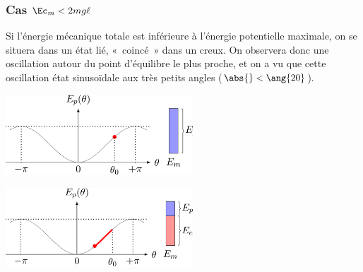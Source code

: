 \documentclass[../../main/main.tex]{subfiles}
\begin{document}
\subsubsection{Cas $\Ec_m < 2mg\ell$}
Si l'énergie mécanique totale est inférieure à l'énergie potentielle maximale, on se
situera dans un état lié, «~coincé~» dans un creux. On observera donc une
oscillation autour du point d'équilibre le plus proche, et on a vu que cette
oscillation état sinusoïdale aux très petits angles ($\abs{\tt} < \ang{20}$).

\begin{minipage}{0.45\linewidth}
	\begin{center}
		\includegraphics[width=7cm]{stab_pend-b}
	\end{center}
\end{minipage}
\hfill
\begin{minipage}{0.45\linewidth}
	\begin{center}
		\includegraphics[width=7cm]{stab_pend-c}
	\end{center}
\end{minipage}
\end{document}
